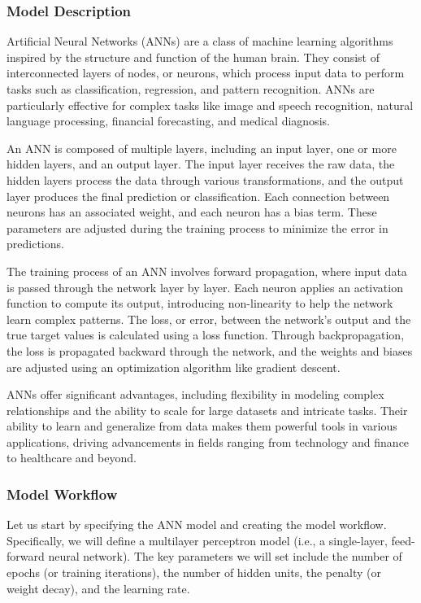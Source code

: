 \documentclass[
  letterpaper,
  DIV=11,
  numbers=noendperiod]{scrartcl}
\begin{document}
\subsubsection{Model Description}\label{model-description-2}

Artificial Neural Networks (ANNs) are a class of machine learning
algorithms inspired by the structure and function of the human brain.
They consist of interconnected layers of nodes, or neurons, which
process input data to perform tasks such as classification, regression,
and pattern recognition. ANNs are particularly effective for complex
tasks like image and speech recognition, natural language processing,
financial forecasting, and medical diagnosis.

An ANN is composed of multiple layers, including an input layer, one or
more hidden layers, and an output layer. The input layer receives the
raw data, the hidden layers process the data through various
transformations, and the output layer produces the final prediction or
classification. Each connection between neurons has an associated
weight, and each neuron has a bias term. These parameters are adjusted
during the training process to minimize the error in predictions.

The training process of an ANN involves forward propagation, where input
data is passed through the network layer by layer. Each neuron applies
an activation function to compute its output, introducing non-linearity
to help the network learn complex patterns. The loss, or error, between
the network's output and the true target values is calculated using a
loss function. Through backpropagation, the loss is propagated backward
through the network, and the weights and biases are adjusted using an
optimization algorithm like gradient descent.

ANNs offer significant advantages, including flexibility in modeling
complex relationships and the ability to scale for large datasets and
intricate tasks. Their ability to learn and generalize from data makes
them powerful tools in various applications, driving advancements in
fields ranging from technology and finance to healthcare and beyond.

\subsubsection{Model Workflow}\label{model-workflow-2}

Let us start by specifying the ANN model and creating the model
workflow. Specifically, we will define a multilayer perceptron model
(i.e., a single-layer, feed-forward neural network). The key parameters
we will set include the number of epochs (or training iterations), the
number of hidden units, the penalty (or weight decay), and the learning
rate.
\end{document}
